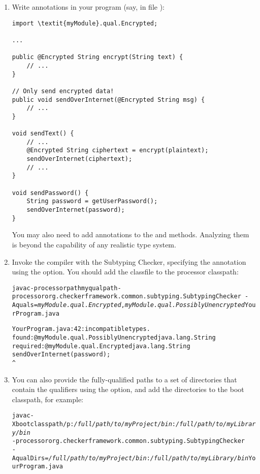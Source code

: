 \begin{enumerate}
\item
  Write  annotations in your program (say, in file
  ):

\begin{Verbatim}
import \textit{myModule}.qual.Encrypted;

...

public @Encrypted String encrypt(String text) {
    // ...
}

// Only send encrypted data!
public void sendOverInternet(@Encrypted String msg) {
    // ...
}

void sendText() {
    // ...
    @Encrypted String ciphertext = encrypt(plaintext);
    sendOverInternet(ciphertext);
    // ...
}

void sendPassword() {
    String password = getUserPassword();
    sendOverInternet(password);
}
\end{Verbatim}

You may also need to add  annotations to the
 and  methods.  Analyzing them is beyond the
capability of any realistic type system.

\item
  Invoke the compiler with the Subtyping Checker, specifying the
   annotation using the  option.
  You should add the  classfile to the processor classpath:

\begin{alltt}
  javac -processorpath myqualpath -processor org.checkerframework.common.subtyping.SubtypingChecker \
        -Aquals=\textit{myModule.qual.Encrypted},\textit{myModule.qual.PossiblyUnencrypted} YourProgram.java

YourProgram.java:42: incompatible types.
found   : @myModule.qual.PossiblyUnencrypted java.lang.String
required: @myModule.qual.Encrypted java.lang.String
    sendOverInternet(password);
                     ^
\end{alltt}

\item
You can also provide the fully-qualified paths to a set of directories
that contain the qualifiers using the \code{-AqualDirs} option, and add
the directories to the boot classpath, for example:

\begin{alltt}
  javac -Xbootclasspath/p:\textit{/full/path/to/myProject/bin}:\textit{/full/path/to/myLibrary/bin} \ttbs
        -processor org.checkerframework.common.subtyping.SubtypingChecker \ttbs
        -AqualDirs=\textit{/full/path/to/myProject/bin}:\textit{/full/path/to/myLibrary/bin} YourProgram.java
\end{alltt}


\end{enumerate}
